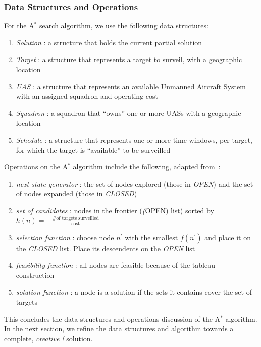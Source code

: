 \documentclass[conference]{IEEEtran}
\newcommand{\heuristic}{${h(n) = -\frac{\text{\# of targets
surveilled}}{\text{cost}}}$}
\begin{document}
\subsubsection{Data Structures and Operations} \label{sec:dataStructures}

For the A$^*$ search algorithm, we use the following data structures:

\begin{enumerate}
  \item[] \emph{Solution} : a structure that holds the current partial solution
  \item[] \emph{Target} : a structure that represents a target to surveil, with
    a geographic location
  \item[] \emph{UAS} : a structure that represents an available Unmanned
    Aircraft System with an assigned squadron and operating cost
  \item[] \emph{Squadron} : a squadron that ``owns'' one or more UASs with a
    geographic location
  \item[] \emph{Schedule} : a structure that represents one or more time
    windows, per target, for which the target is ``available'' to be surveilled
\end{enumerate}

Operations on the A$^*$ algorithm include the following, adapted
from~\cite{lamontAstarEx}:

\begin{enumerate}
  \item[] \emph{next-state-generator} : the set of nodes explored (those in
    \emph{OPEN}) and the set of nodes expanded (those in \emph{CLOSED})
  \item[] \emph{set of candidates} : nodes in the frontier (\emph(OPEN) list)
    sorted by \heuristic
  \item[] \emph{selection function} : choose node $n^\prime$ with the smallest
    $f(n^\prime)$ and place it on the \emph{CLOSED} list. Place its descendents
    on the \emph{OPEN} list
  \item[] \emph{feasibility function} : all nodes are feasible because of the
    tableau construction~\cite{christofides1975}
  \item[] \emph{solution function} : a node is a solution if the sets it
    contains cover the set of targets
\end{enumerate}

This concludes the data structures and operations discussion of the A$^*$
algorithm. In the next section, we refine the data structures and algorithm
towards a complete, \emph{creative !} solution.
\end{document}
